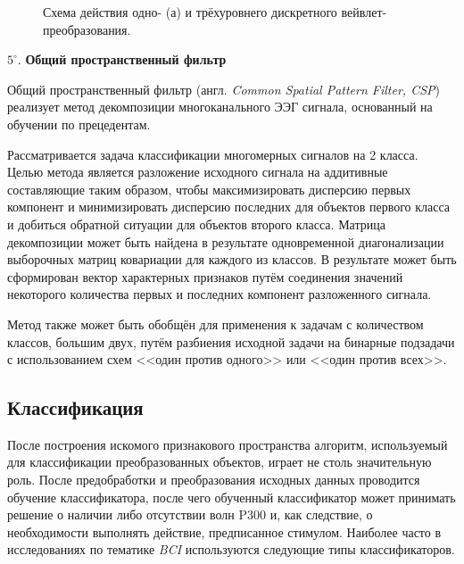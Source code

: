 \documentclass[12pt,fleqn]{article}
\begin{document}
\begin{figure}[h!]
\begin{minipage}[h!]{1.0\linewidth}
\end{minipage}
\begin{minipage}[h!]{1.0\linewidth}
\end{minipage}
\caption{Схема действия одно- (а) и трёхуровнего дискретного вейвлет-преобразования.}
\label{wavelet_scheme}
\end{figure}
	\par $5^{\circ}.$ {\bf Общий пространственный фильтр}
	\par Общий пространственный фильтр (англ. {\it Common Spatial Pattern Filter, CSP}) реализует метод декомпозиции многоканального ЭЭГ сигнала, основанный на обучении по прецедентам.
	\par Рассматривается задача классификации многомерных сигналов на 2 класса. Целью метода является разложение исходного сигнала на аддитивные составляющие таким образом, чтобы максимизировать дисперсию первых компонент и минимизировать дисперсию последних для объектов первого класса и добиться обратной ситуации для объектов второго класса. Матрица декомпозиции может быть найдена в результате одновременной диагонализации выборочных матриц ковариации для каждого из классов. В результате может быть сформирован вектор характерных признаков путём соединения значений некоторого количества первых и последних компонент разложенного сигнала.
	\par Метод также может быть обобщён для применения к задачам с количеством классов, большим двух, путём разбиения исходной задачи на бинарные подзадачи с использованием схем <<один против одного>> или <<один против всех>>.

	\subsection{Классификация}
	\par После построения искомого признакового пространства алгоритм, используемый для классификации преобразованных объектов, играет не столь значительную роль. После предобработки и преобразования исходных данных проводится обучение классификатора, после чего обученный классификатор может принимать решение о наличии либо отсутствии волн P300 и, как следствие, о необходимости выполнять действие, предписанное стимулом. Наиболее часто в исследованиях по тематике {\it BCI} используются следующие типы классификаторов.
\end{document}
